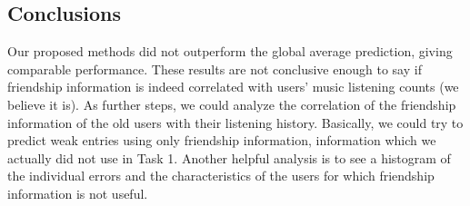 
\subsection{Conclusions}
Our proposed methods did not outperform the global average prediction, giving comparable performance. These results are not conclusive enough to say if friendship information is indeed correlated with users' music listening counts (we believe it is). As further steps, we could analyze the correlation of the friendship information of the old users with their listening history. Basically, we could try to predict weak entries using only friendship information, information which we actually did not use in Task 1. Another helpful analysis is to see a histogram of the individual errors and the characteristics of the users for which friendship information is not useful.
